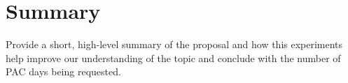 \documentclass[titlepage,10pt]{article}
\begin{document}
\section{Summary}

Provide a short, high-level summary of the proposal and how this experiments help improve our understanding of the topic and conclude with the number of PAC days being requested.

%
%
%


%
%
%
%
\newpage


\end{document}
